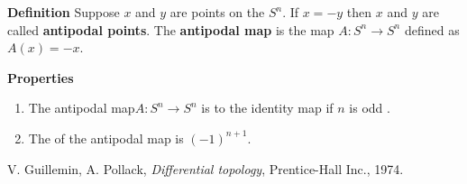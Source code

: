\documentclass[12pt]{article}
\begin{document}
{\bf Definition}
Suppose $x$ and $y$ are points on the 
 $S^n$. 
If $x=-y$ then $x$ and 
$y$ are called {\bf antipodal points}. The
{\bf antipodal map} is the map $A: S^n\to S^n$ defined as
$A(x)=-x$.

\textbf{Properties}
\begin{enumerate}
\item
The antipodal map$A:S^n\to S^n$ is 
to the identity map if $n$ is odd \cite{guillemin}.
\item The  of the 
antipodal map is $(-1)^{n+1}$.
\end{enumerate}

\begin{thebibliography}{9}
  V. Guillemin, A. Pollack,
\emph{Differential topology}, Prentice-Hall Inc., 1974.
 \end{thebibliography}
\end{document}
